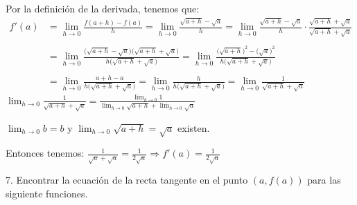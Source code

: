 \documentclass[12pt]{article}
\begin{document}
\begin{enumerate}[\hspace{9px} a)]
        Por la definición de la derivada, tenemos que:
        \begin{align*}
            f'(a)&=\displaystyle\lim_{h \to 0}\frac{f(a+h)-f(a)}{h}=\displaystyle\lim_{h \to 0}\frac{\sqrt{a+h}-\sqrt{a}}{h}=\displaystyle\lim_{h \to 0}\frac{\sqrt{a+h}-\sqrt{a}}{h} \cdot \frac{\sqrt{a+h}+\sqrt{a}}{\sqrt{a+h}+\sqrt{a}}\\ \\
            &=\displaystyle\lim_{h \to 0}\frac{\big(\sqrt{a+h}-\sqrt{a}\big)\big(\sqrt{a+h}+\sqrt{a}\big)}{h\big(\sqrt{a+h}+\sqrt{a}\big)}=\displaystyle\lim_{h \to 0}\frac{\big(\sqrt{a+h}\big)^2-(\sqrt{a}\big)^2}{h\big(\sqrt{a+h}+\sqrt{a}\big)}\\ \\
            &=\displaystyle\lim_{h \to 0}\frac{a+h-a}{h\big(\sqrt{a+h}+\sqrt{a}\big)}=\displaystyle\lim_{h \to 0}\frac{h}{h\big(\sqrt{a+h}+\sqrt{a}\big)}=\displaystyle\lim_{h \to 0}\frac{1}{\sqrt{a+h}+\sqrt{a}}
        \end{align*}\medskip
        \(\displaystyle\lim_{h \to 0}\frac{1}{\sqrt{a+h}+\sqrt{a}}=\displaystyle\frac{\displaystyle\lim_{h \to 0}1}{\displaystyle\lim_{h \to 0}\sqrt{a+h}+\displaystyle\lim_{h \to 0}\sqrt{a}}\)\medskip

        \(\displaystyle\lim_{h \to 0}b=b\) y \(\displaystyle\lim_{h \to 0}\sqrt{a+h}=\sqrt{a}\)  existen.\medskip

        Entonces tenemos: \quad \(\displaystyle\frac{1}{\sqrt{a}+\sqrt{a}}=\frac{1}{2\sqrt{a}} \Longrightarrow f'(a)=\frac{1}{2\sqrt{a}}\)

\end{enumerate}

7. Encontrar la ecuación de la recta tangente en el punto \((a,f(a))\) para las siguiente funciones.
\end{document}
